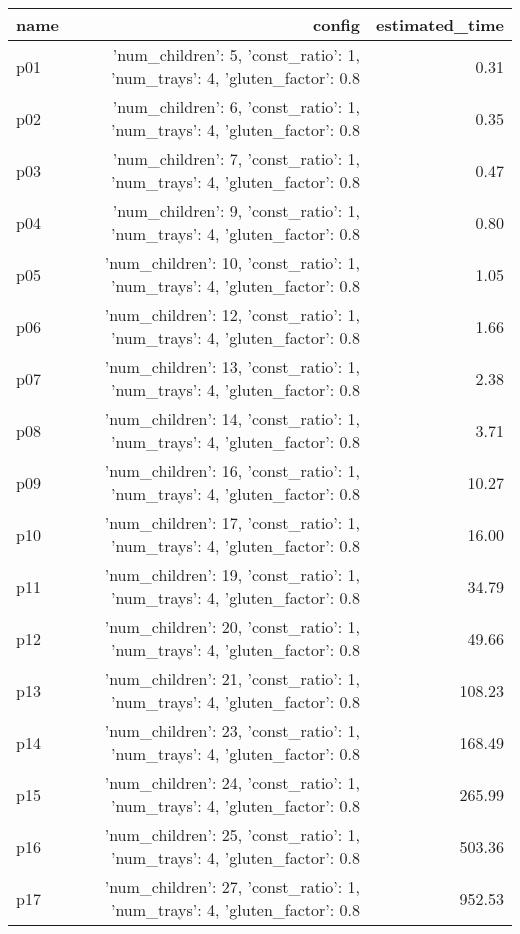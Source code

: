 \documentclass{article}
\begin{document}
                            \begin{center}
                            \scriptsize
                            \begin{tabular}{@{}l|r|r@{}}
                            name & config & estimated\_time\\\midrule
                              p01&{'num\_children': 5, 'const\_ratio': 1, 'num\_trays': 4, 'gluten\_factor': 0.8}&0.31\\
  p02&{'num\_children': 6, 'const\_ratio': 1, 'num\_trays': 4, 'gluten\_factor': 0.8}&0.35\\
  p03&{'num\_children': 7, 'const\_ratio': 1, 'num\_trays': 4, 'gluten\_factor': 0.8}&0.47\\
  p04&{'num\_children': 9, 'const\_ratio': 1, 'num\_trays': 4, 'gluten\_factor': 0.8}&0.80\\
  p05&{'num\_children': 10, 'const\_ratio': 1, 'num\_trays': 4, 'gluten\_factor': 0.8}&1.05\\
  p06&{'num\_children': 12, 'const\_ratio': 1, 'num\_trays': 4, 'gluten\_factor': 0.8}&1.66\\
  p07&{'num\_children': 13, 'const\_ratio': 1, 'num\_trays': 4, 'gluten\_factor': 0.8}&2.38\\
  p08&{'num\_children': 14, 'const\_ratio': 1, 'num\_trays': 4, 'gluten\_factor': 0.8}&3.71\\
  p09&{'num\_children': 16, 'const\_ratio': 1, 'num\_trays': 4, 'gluten\_factor': 0.8}&10.27\\
  p10&{'num\_children': 17, 'const\_ratio': 1, 'num\_trays': 4, 'gluten\_factor': 0.8}&16.00\\
  p11&{'num\_children': 19, 'const\_ratio': 1, 'num\_trays': 4, 'gluten\_factor': 0.8}&34.79\\
  p12&{'num\_children': 20, 'const\_ratio': 1, 'num\_trays': 4, 'gluten\_factor': 0.8}&49.66\\
  p13&{'num\_children': 21, 'const\_ratio': 1, 'num\_trays': 4, 'gluten\_factor': 0.8}&108.23\\
  p14&{'num\_children': 23, 'const\_ratio': 1, 'num\_trays': 4, 'gluten\_factor': 0.8}&168.49\\
  p15&{'num\_children': 24, 'const\_ratio': 1, 'num\_trays': 4, 'gluten\_factor': 0.8}&265.99\\
  p16&{'num\_children': 25, 'const\_ratio': 1, 'num\_trays': 4, 'gluten\_factor': 0.8}&503.36\\
  p17&{'num\_children': 27, 'const\_ratio': 1, 'num\_trays': 4, 'gluten\_factor': 0.8}&952.53\\

\end{tabular}
\end{center}
\end{document}
